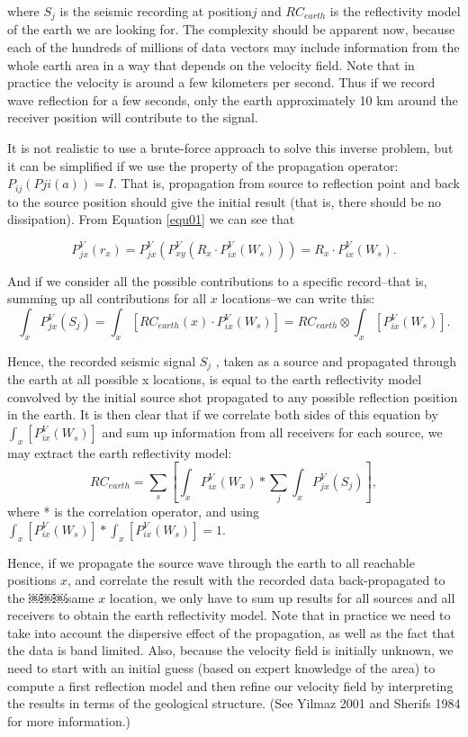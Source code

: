 \documentclass[twocolumn]{article}
\begin{document}
where $S_j$ is the seismic recording at position$j$ and $RC_{earth}$ is the reflectivity model of the earth we are looking for. The complexity should be apparent now, because each of the hundreds of millions of data vectors may include information from the whole earth area in a way that depends on the velocity field. Note that in practice the velocity is around a few kilometers per second. Thus if we record wave reflection for a few seconds, only the earth approximately 10 km around the receiver position will contribute to the signal.

It is not realistic to use a brute-force approach to solve this inverse problem, but it can be simplified if we use the property of the propagation operator: $P_{ij} (Pji (a)) = I$. That is, propagation from source to reflection point and back to the source position should give the initial result (that is, there should be no dissipation). From Equation \ref{equ01} we can see that

\begin{equation}
P^V_{jx}(r_x) = P^V_{jx}(P^V_{xy}(R_x \cdot P^V_{ix} (W_s))) = R_x \cdot P^V_{ix}(W_s).
\label{equ03}
\end{equation}

And if we consider all the possible contributions to a specific record--that is, summing up all contributions for all $x$ locations--we can write this:
\begin{equation}
\int_x P^V_{jx}(S_j) = \int_x[RC_{earth}(x) \cdot P^V_{ix}(W_s)] = RC_{earth} \otimes \int_x[P^V_{ix}(W_s)].
\label{equ04}
\end{equation}

Hence, the recorded seismic signal $S_j$ , taken as a source and propagated through the earth at all possible x locations, is equal to the earth reflectivity model convolved by the initial source shot propagated to any possible reflection position in the earth. It is then clear that if we correlate both sides of this equation by $\int_x[P^V_{ix}(W_s)]$ and sum up information from all receivers for each source, we may extract the earth reflectivity model:
$$RC_{earth} = \sum_s[\int_x P^V_{ix}(W_x)*\sum_j \int_x P^V_{jx}(S_j)],$$
where * is the correlation operator, and using $\int_x[P^V_{ix}(W_s)]*\int_x[P^V_{ix}(W_s)]=1$.

Hence, if we propagate the source wave through the earth to all reachable positions $x$, and correlate
the result with the recorded data back-propagated to the ￼￼￼same $x$ location, we only have to sum up results for all sources and all receivers to obtain the earth reflectivity model. Note that in practice we need to take into account the dispersive effect of the propagation, as well as the fact that the data is band limited. Also, because the velocity field is initially unknown, we need to start with an initial guess (based on expert knowledge of the area) to compute a first reflection model and then refine our velocity field by interpreting the results in terms of the geological structure. (See Yilmaz 2001 and Sherifs 1984 for more information.)
\end{document}
